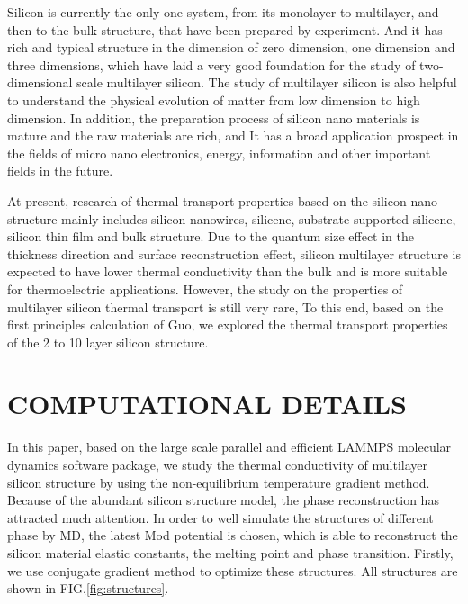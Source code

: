 \documentclass[%
 reprint,
 amsmath,amssymb,
 aps,
 prb,
]{revtex4-1}
\begin{document}
Silicon  is currently the only one system, from its monolayer to multilayer, and then to the bulk structure, that have been prepared by experiment. And it has rich and typical structure in the dimension of zero dimension, one dimension and three dimensions, which have laid a very good foundation for the study of two-dimensional scale multilayer silicon. The study of multilayer silicon is also helpful to understand the physical evolution of matter from low dimension to high dimension. In addition, the preparation process of silicon nano materials is mature and the raw materials are rich, and It has a broad application prospect in the fields of micro nano electronics, energy, information and other important fields in the future.

At present, research of thermal transport properties based on the silicon nano structure mainly includes silicon nanowires\cite{Hochbaum2008,Yang2010,Shi2009,Boukai2008}, silicene\cite{Pei2013,Ng2013,Xie2014,Zhang2014,Liu2014}, substrate supported silicene\cite{Wang2015,Zhang2015a}, silicon thin film and bulk structure\cite{Bodapati2006,Tang2013Thermal,Jeong2012Thermal,Liu2006Thermal,Wang2006Lattice}. Due to the quantum size effect in the thickness direction and surface reconstruction effect, silicon multilayer structure is expected to have lower thermal conductivity than the bulk and is more suitable for thermoelectric applications. However, the study on the properties of multilayer silicon thermal transport is still very rare, To this end, based on the first principles calculation of Guo\cite{Guo2015Structural}, we explored the thermal transport properties of the 2 to 10 layer silicon structure.

\section{COMPUTATIONAL DETAILS}

In this paper, based on the large scale parallel and efficient LAMMPS molecular dynamics software package\cite{Parks2007}, we study the thermal conductivity of multilayer silicon structure by using the non-equilibrium temperature gradient method. Because of the abundant silicon structure model, the phase reconstruction has attracted much attention. In order to well simulate the structures of different phase by MD, the latest Mod potential is chosen\cite{Kumagai2007Development}, which is able to reconstruct the silicon material elastic constants, the melting point and phase transition. Firstly, we use conjugate gradient method to optimize these structures. All structures are shown in FIG.\ref{fig:structures}.
\end{document}
